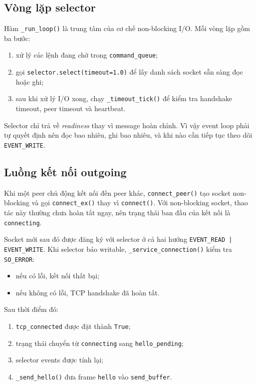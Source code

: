 \subsection{Vòng lặp selector}
Hàm \texttt{\_run\_loop()} là trung tâm của cơ chế non-blocking I/O. Mỗi vòng lặp gồm ba bước:
\begin{enumerate}[leftmargin=2em]
    \item xử lý các lệnh đang chờ trong \texttt{command\_queue};
    \item gọi \texttt{selector.select(timeout=1.0)} để lấy danh sách socket sẵn sàng đọc hoặc ghi;
    \item sau khi xử lý I/O xong, chạy \texttt{\_timeout\_tick()} để kiểm tra handshake timeout, peer timeout và heartbeat.
\end{enumerate}

Selector chỉ trả về \textit{readiness} thay vì message hoàn chỉnh. Vì vậy event loop phải tự quyết định nên đọc bao nhiêu, ghi bao nhiêu, và khi nào cần tiếp tục theo dõi \texttt{EVENT\_WRITE}.

\subsection{Luồng kết nối outgoing}
Khi một peer chủ động kết nối đến peer khác, \texttt{connect\_peer()} tạo socket non-blocking và gọi \texttt{connect\_ex()} thay vì \texttt{connect()}. Với non-blocking socket, thao tác này thường chưa hoàn tất ngay, nên trạng thái ban đầu của kết nối là \texttt{connecting}.

Socket mới sau đó được đăng ký với selector ở cả hai hướng \texttt{EVENT\_READ | EVENT\_WRITE}. Khi selector báo writable, \texttt{\_service\_connection()} kiểm tra \texttt{SO\_ERROR}:
\begin{itemize}[leftmargin=2em]
    \item nếu có lỗi, kết nối thất bại;
    \item nếu không có lỗi, TCP handshake đã hoàn tất.
\end{itemize}

Sau thời điểm đó:
\begin{enumerate}[leftmargin=2em]
    \item \texttt{tcp\_connected} được đặt thành \texttt{True};
    \item trạng thái chuyển từ \texttt{connecting} sang \texttt{hello\_pending};
    \item selector events được tính lại;
    \item \texttt{\_send\_hello()} đưa frame \texttt{hello} vào \texttt{send\_buffer}.
\end{enumerate}

